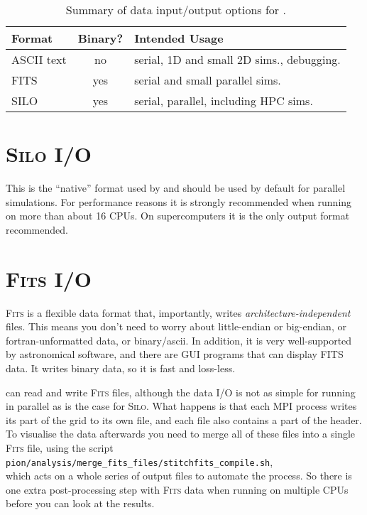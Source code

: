 \documentclass[a4paper,11pt]{report}
\begin{document}
\begin{table}
  \centering
  \caption{
    Summary of data input/output options for \pion{}.
  }
  \begin{tabular}{ l c l}
    Format & Binary? & Intended Usage \\
    \hline
    ASCII text & no   & serial, 1D and small 2D sims., debugging. \\
    FITS       & yes  & serial and small parallel sims. \\
    SILO       & yes  & serial, parallel, including HPC sims. \\
  \end{tabular}
  \label{tab:ioformats}
\end{table}


\section{\textsc{Silo} I/O}
This is the ``native'' format used by \pion{} and should be used by default for parallel simulations.
For performance reasons it is strongly recommended when running on more than about 16 CPUs.
On supercomputers it is the only output format recommended.


\section{\textsc{Fits} I/O}
\textsc{Fits} is a flexible data format that, importantly, writes \emph{architecture-independent} files.
This means you don't need to worry about little-endian or big-endian, or fortran-unformatted data, or binary/ascii.
In addition, it is very well-supported by astronomical software, and there are GUI programs that can display FITS data.
It writes binary data, so it is fast and loss-less.

\pion{} can read and write \textsc{Fits} files, although the data I/O is not as simple for running in parallel as is the case for \textsc{Silo}.
What happens is that each MPI process writes its part of the grid to its own file, and each file also contains a part of the header.
To visualise the data afterwards you need to merge all of these files into a single \textsc{Fits} file, using the script \\
\verb|pion/analysis/merge_fits_files/stitchfits_compile.sh|,\\
which acts on a whole series of output files to automate the process.
So there is one extra post-processing step with \textsc{Fits} data when running on multiple CPUs before you can look at the results.
\end{document}
